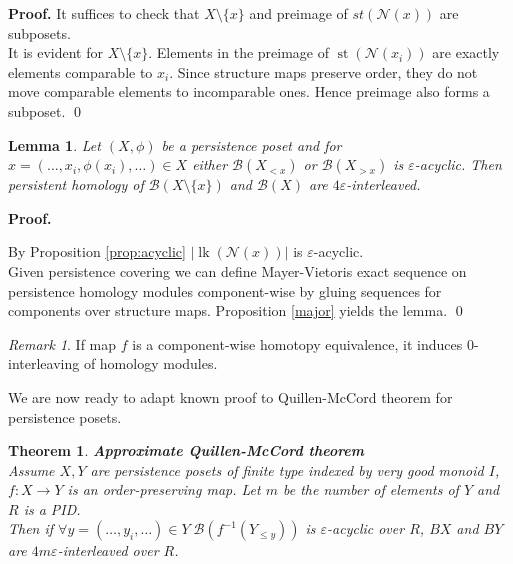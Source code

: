 \documentclass[english,12pt]{article}
\newcounter{stmcounter}[section]
\newcounter{thcounter}
\numberwithin{equation}{section}
\newtheorem{lemma}[stmcounter]{Lemma}
\newtheorem{theorem}[thcounter]{Theorem}
\theoremstyle{definition}
\theoremstyle{remark}
\newtheorem{remark}[stmcounter]{Remark}
\newenvironment{pf}{\noindent\textbf{Proof.}}{\qed}
\begin{document}
\begin{pf}
  It suffices to check that $X \setminus \{x\}$ and preimage of $st(\mathcal{N}(x))$ are subposets.\\

  It is evident for $X \setminus \{x\}$. Elements in the preimage of $\operatorname{st}(\mathcal{N}(x_i))$ are exactly elements comparable to $x_i$. Since structure maps preserve order, they do not move comparable elements to incomparable ones. Hence preimage also forms a subposet.
\end{pf}\\

\begin{lemma}
  Let $(X,\phi)$ be a persistence poset and for $x=(\ldots,x_i,\phi(x_i),\ldots) \in X$ either $\mathcal{B}(X_{< x})$ or $\mathcal{B}(X_{> x})$ is $\varepsilon$-acyclic. Then persistent homology of $\mathcal{B}(X \setminus \{x\})$ and $\mathcal{B}(X)$ are $4\varepsilon$-interleaved.
\end{lemma}

\begin{pf} ~ \par
  By Proposition \ref{prop:acyclic} $\left|\operatorname{lk}(\mathcal{N}(x))\right|$ is $\varepsilon$-acyclic.\\

  Given persistence covering we can define Mayer-Vietoris exact sequence on persistence homology modules component-wise by gluing sequences for components over structure maps. Proposition \ref{major} yields the lemma.
\end{pf}

\begin{remark}
  If map $f$ is a component-wise homotopy equivalence, it induces $0$-interleaving of homology modules.
\end{remark}

We are now ready to adapt known proof to Quillen-McCord theorem for persistence posets.

\begin{theorem} \textbf{Approximate Quillen-McCord theorem}\\
  Assume $X, Y$ are persistence posets of finite type indexed by very good monoid $I$, $f : X \to Y$ is an order-preserving map. Let $m$ be the number of elements of $Y$ and $R$ is a PID.\\

  Then if $\forall y=(\ldots,y_i,\ldots) \in Y\;\mathcal{B}(f^{-1}(Y_{\leqslant y}))$ is $\varepsilon$-acyclic over $R$, $BX$ and $BY$ are $4m\varepsilon$-interleaved over $R$.\\
\end{theorem}
\end{document}
